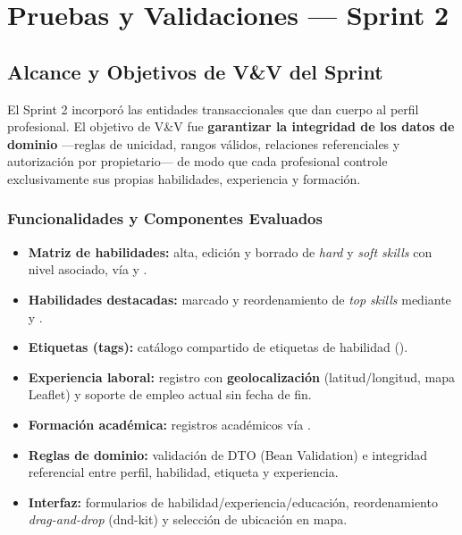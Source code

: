 \chapter{Pruebas y Validaciones — Sprint 2}
\label{ch:sprint2}

\section{Alcance y Objetivos de V\&V del Sprint}
\label{sec:s2-alcance}

El Sprint 2 incorporó las entidades transaccionales que dan cuerpo al perfil profesional.
El objetivo de V\&V fue \textbf{garantizar la integridad de los datos de dominio} —reglas
de unicidad, rangos válidos, relaciones referenciales y autorización por propietario— de
modo que cada profesional controle exclusivamente sus propias habilidades, experiencia y
formación.

\subsection{Funcionalidades y Componentes Evaluados}
\label{sec:s2-funcionalidades}

\begin{itemize}
    \item \textbf{Matriz de habilidades:} alta, edición y borrado de \textit{hard} y
    \textit{soft skills} con nivel asociado, vía 
    y .
    \item \textbf{Habilidades destacadas:} marcado y reordenamiento de \textit{top skills}
    mediante  y
    .
    \item \textbf{Etiquetas (tags):} catálogo compartido de etiquetas de habilidad
    ().
    \item \textbf{Experiencia laboral:} registro con \textbf{geolocalización}
    (latitud/longitud, mapa Leaflet) y soporte de empleo actual sin fecha de fin.
    \item \textbf{Formación académica:} registros académicos vía
    .
    \item \textbf{Reglas de dominio:} validación de DTO (Bean Validation) e integridad
    referencial entre perfil, habilidad, etiqueta y experiencia.
    \item \textbf{Interfaz:} formularios de habilidad/experiencia/educación, reordenamiento
    \textit{drag-and-drop} (dnd-kit) y selección de ubicación en mapa.
\end{itemize}

